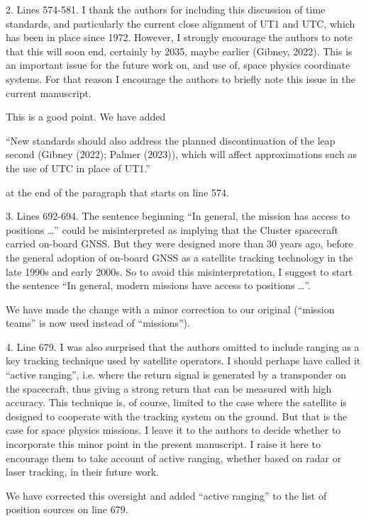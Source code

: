 \documentclass[11pt]{article}
\begin{document}
2. Lines 574-581. I thank the authors for including this discussion of time standards, and particularly the current close alignment of UT1 and UTC, which has been in place since 1972. However, I strongly encourage the authors to note that this will soon end, certainly by 2035, maybe earlier (Gibney, 2022). This is an important issue for the future work on, and use of, space physics coordinate systems. For that reason I encourage the authors to briefly note this issue in the current manuscript.
\\
{\color{violet}
\begin{leftbar}
This is a good point. We have added

``New standards should also address the planned discontinuation of the leap second (Gibney (2022); Palmer (2023)), which will affect approximations such as the use of UTC in place of UT1.''

at the end of the paragraph that starts on line 574.

\end{leftbar}
}

3. Lines 692-694. The sentence beginning “In general, the mission has access to positions …” could be misinterpreted as implying that the Cluster spacecraft carried on-board GNSS. But they were designed more than 30 years ago, before the general adoption of on-board GNSS as a satellite tracking technology in the late 1990s and early 2000s. So to avoid this misinterpretation, I suggest to start the sentence “In general, modern missions have access to positions …”.
\\
{\color{violet}
\begin{leftbar}
We have made the change with a minor correction to our original (``mission teams'' is now used instead of ``missions'').
\end{leftbar}
}

4. Line 679. I was also surprised that the authors omitted to include ranging as a key tracking technique used by satellite operators. I should perhaps have called it “active ranging”, i.e. where the return signal is generated by a transponder on the spacecraft, thus giving a strong return that can be measured with high accuracy. This technique is, of course, limited to the case where the satellite is designed to cooperate with the tracking system on the ground. But that is the case for space physics missions. I leave
it to the authors to decide whether to incorporate this minor point in the present manuscript. I raise it here to encourage them to take account of active ranging, whether based on radar or laser tracking, in their future work.
\\
{\color{violet}
\begin{leftbar}
We have corrected this oversight and added ``active ranging'' to the list of position sources on line 679.
\end{leftbar}
}
\end{document}
